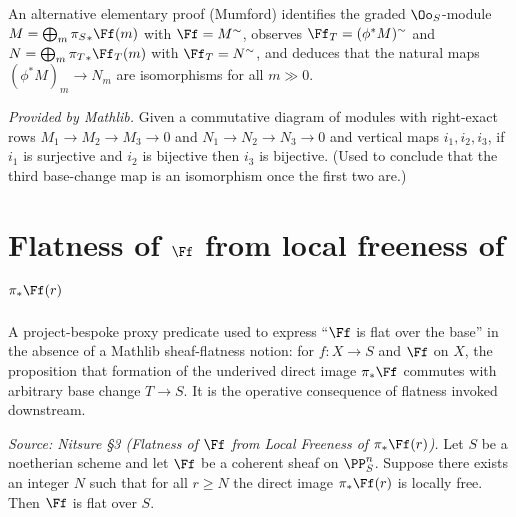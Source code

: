 \begin{remark}
  An alternative elementary proof (Mumford) identifies the graded
  $\Oo_S$-module $M=\bigoplus_{m}{\pi_S}_*\Ff(m)$ with $\Ff = M^\sim$, observes
  $\Ff_T=(\phi^*M)^\sim$ and $N=\bigoplus_m{\pi_T}_*\Ff_T(m)$ with
  $\Ff_T=N^\sim$, and deduces that the natural maps $(\phi^*M)_m\to N_m$ are
  isomorphisms for all $m\gg 0$.
\end{remark}

\begin{lemma}
  \label{lem:five-lemma}
  \mathlibok
  \textit{Provided by Mathlib.}
  Given a commutative diagram of modules with right-exact rows
  $M_1\to M_2\to M_3\to 0$ and $N_1\to N_2\to N_3\to 0$ and vertical maps
  $i_1,i_2,i_3$, if $i_1$ is surjective and $i_2$ is bijective then $i_3$ is
  bijective. (Used to conclude that the third base-change map is an isomorphism
  once the first two are.)
\end{lemma}

\section{Flatness of \texorpdfstring{$\Ff$}{F} from local freeness of \texorpdfstring{$\pi_*\Ff(r)$}{pi\_* F(r)}}

\begin{definition}
  \label{def:direct-image-commutes-base-change}
  A project-bespoke proxy predicate used to express ``$\Ff$ is flat over the
  base'' in the absence of a Mathlib sheaf-flatness notion: for $f\colon X\to S$
  and $\Ff$ on $X$, the proposition that formation of the underived direct image
  $\pi_*\Ff$ commutes with arbitrary base change $T\to S$. It is the operative
  consequence of flatness invoked downstream.
\end{definition}

\begin{lemma}
  \label{lem:flatness-from-local-freeness}
  \textit{Source: Nitsure §3 (Flatness of $\Ff$ from Local Freeness of $\pi_*\Ff(r)$).}
  Let $S$ be a noetherian scheme and let $\Ff$ be a coherent sheaf on $\PP^n_S$.
  Suppose there exists an integer $N$ such that for all $r\ge N$ the direct image
  $\pi_*\Ff(r)$ is locally free. Then $\Ff$ is flat over $S$.
\end{lemma}

